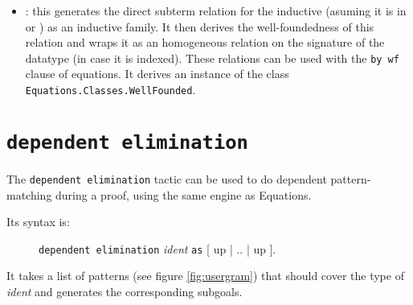 \begin{itemize}
\item {}: this generates the direct subterm relation for the
  inductive (asuming it is in  or ) as an inductive family.
  It then derives the well-foundedness of this relation and wraps it
  as an homogeneous relation on the signature of the datatype (in case
  it is indexed). These relations can be used with the \texttt{by wf}
  clause of equations. It derives an instance of the class
  \texttt{Equations.Classes.WellFounded}.

\end{itemize}

\section{\texttt{dependent elimination}}

The \texttt{dependent elimination} tactic can be used to do dependent
pattern-matching during a proof, using the same engine as Equations.

Its syntax is:
\begin{figure}[h]
  \texttt{dependent elimination} \textit{ident} \texttt{as} [ up | .. | up ].
\end{figure}

It takes a list of patterns (see figure \ref{fig:usergram}) that should cover the type of \textit{ident}
and generates the corresponding subgoals.

